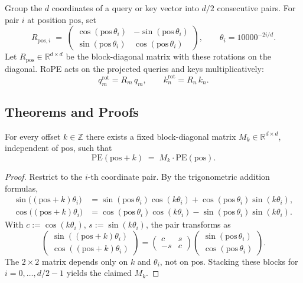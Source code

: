 \begin{definition}
Group the $d$ coordinates of a query or key vector into $d/2$ consecutive pairs. For pair $i$ at position $\mathrm{pos}$, set
\[
R_{\mathrm{pos}, i} \;=\; \begin{pmatrix} \cos(\mathrm{pos}\,\theta_i) & -\sin(\mathrm{pos}\,\theta_i) \\ \sin(\mathrm{pos}\,\theta_i) & \cos(\mathrm{pos}\,\theta_i) \end{pmatrix},
\qquad \theta_i = 10000^{-2i/d}.
\]
Let $R_{\mathrm{pos}} \in \mathbb{R}^{d \times d}$ be the block-diagonal matrix with these rotations on the diagonal. RoPE acts on the projected queries and keys multiplicatively:
\[
q_m^{\mathrm{rot}} = R_m\, q_m, \qquad k_n^{\mathrm{rot}} = R_n\, k_n.
\]
\end{definition}

\subsection*{Theorems and Proofs}

\begin{theorem}
\label{thm:sinusoidal-shift}
For every offset $k \in \mathbb{Z}$ there exists a fixed block-diagonal matrix $M_k \in \mathbb{R}^{d \times d}$, independent of $\mathrm{pos}$, such that
\[
\mathrm{PE}(\mathrm{pos} + k) \;=\; M_k \cdot \mathrm{PE}(\mathrm{pos}).
\]
\end{theorem}

\begin{proof}
Restrict to the $i$-th coordinate pair. By the trigonometric addition formulas,
\begin{align*}
\sin\big((\mathrm{pos}+k)\theta_i\big) &= \sin(\mathrm{pos}\,\theta_i)\cos(k\theta_i) + \cos(\mathrm{pos}\,\theta_i)\sin(k\theta_i), \\
\cos\big((\mathrm{pos}+k)\theta_i\big) &= \cos(\mathrm{pos}\,\theta_i)\cos(k\theta_i) - \sin(\mathrm{pos}\,\theta_i)\sin(k\theta_i).
\end{align*}
With $c := \cos(k\theta_i)$, $s := \sin(k\theta_i)$, the pair transforms as
\[
\begin{pmatrix} \sin((\mathrm{pos}+k)\theta_i) \\ \cos((\mathrm{pos}+k)\theta_i) \end{pmatrix}
= \begin{pmatrix} c & s \\ -s & c \end{pmatrix}
\begin{pmatrix} \sin(\mathrm{pos}\,\theta_i) \\ \cos(\mathrm{pos}\,\theta_i) \end{pmatrix}.
\]
The $2\times 2$ matrix depends only on $k$ and $\theta_i$, not on $\mathrm{pos}$. Stacking these blocks for $i = 0, \ldots, d/2 - 1$ yields the claimed $M_k$.
\end{proof}

